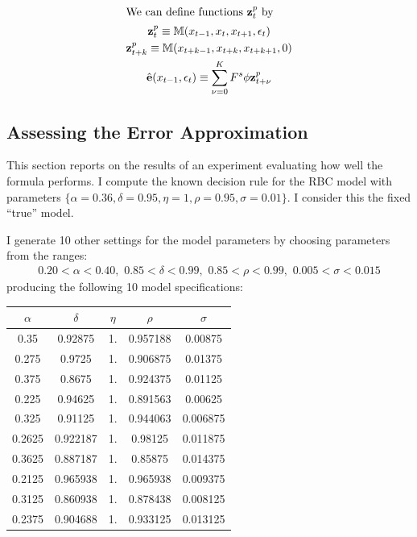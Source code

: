 \documentclass[12pt]{article}
\begin{document}
\begin{gather*}
 \intertext{We can define functions $\mathbf{z}^p_t$ by}
\mathbf{z}^p_t\equiv
\mathbb{M}(x_{t-1},x_t,x_{t+1},\epsilon_t)\\
\mathbf{z}^p_{t+k}\equiv
\mathbb{M}(x_{t+k-1},x_{t+k},x_{t+k+1},0)\\
\hat{\mathbf{e}}(x_{t-1},\epsilon_t)\equiv \sum_{{\nu}=0}^K F^s \phi \mathbf{z}^p_{t+\nu}\\
\end{gather*}

\subsection{Assessing the Error Approximation}
\label{sec:assess-error-appr}


This section reports on the results of an experiment evaluating how well the 
formula performs.  
I compute the known decision rule for the RBC model with parameters
$\{\alpha=0.36,\delta=0.95,\eta=1,\rho=0.95,\sigma=0.01\}$.  I consider this
the fixed ``true'' model.

I generate  10 other settings for the model parameters by choosing
parameters from the ranges:
\begin{gather*}
 0.20 <\alpha<0.40,\,\,0.85<\delta<0.99,\,\,0.85<\rho<0.99,\,\,0.005<\sigma<0.015
\end{gather*}
producing the following 10 model specifications:


\vspace{.2in}



   \begin{tabular}{|c|c|c|c|c|}
\hline
\multicolumn{1}{|c|}{$\alpha$}&
\multicolumn{1}{|c|}{$\delta$}&
\multicolumn{1}{|c|}{$\eta$}&
\multicolumn{1}{|c|}{$\rho$}&
\multicolumn{1}{|c|}{$\sigma$}\\
\hline
                   0.35 & 0.92875 & 1. & 0.957188 & 0.00875 \\
\hline
                   0.275 & 0.9725 & 1. & 0.906875 & 0.01375 \\
\hline
                   0.375 & 0.8675 & 1. & 0.924375 & 0.01125 \\
\hline
                   0.225 & 0.94625 & 1. & 0.891563 & 0.00625 \\
\hline
                   0.325 & 0.91125 & 1. & 0.944063 & 0.006875 \\
\hline
                   0.2625 & 0.922187 & 1. & 0.98125 & 0.011875 \\
\hline
                   0.3625 & 0.887187 & 1. & 0.85875 & 0.014375 \\
\hline
                   0.2125 & 0.965938 & 1. & 0.965938 & 0.009375 \\
\hline
                   0.3125 & 0.860938 & 1. & 0.878438 & 0.008125 \\
\hline
                   0.2375 & 0.904688 & 1. & 0.933125 & 0.013125 \\
\hline
                  \end{tabular}
\end{document}
